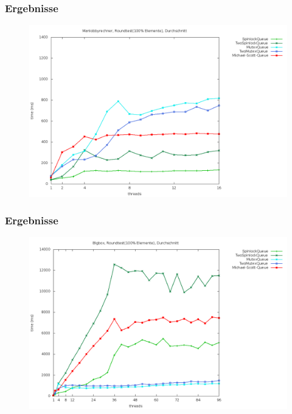\documentclass[svgnames]{beamer}
\begin{document}
\begin{frame}
\frametitle{Ergebnisse}
\begin {figure}
      \begin{center}
	\includegraphics[width=\textwidth]{manr2a.png}
     \end{center}
\end {figure}
\end{frame}

\begin{frame}
\frametitle{Ergebnisse}
\begin {figure}
      \begin{center}
	\includegraphics[width=\textwidth]{bigboxr2a.png}
     \end{center}
\end {figure}
\end{frame}
\end{document}
